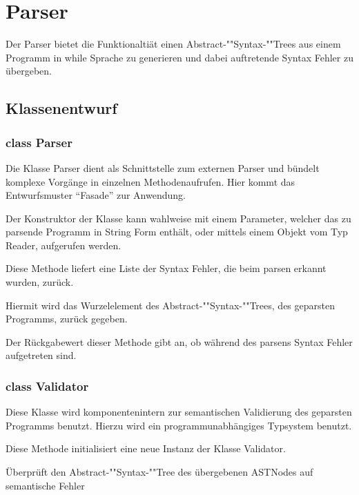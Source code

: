 \section{Parser}

Der Parser bietet die Funktionaltiät einen Abstract-""Syntax-""Trees aus einem Programm in while Sprache zu generieren und dabei auftretende Syntax Fehler zu übergeben.

\subsection{Klassenentwurf}

\subsubsection{class Parser}

Die Klasse Parser dient als Schnittstelle zum externen Parser und bündelt komplexe Vorgänge in einzelnen Methodenaufrufen. Hier kommt das Entwurfsmuster "`Fasade"' zur Anwendung.

\begin{description}
		Der Konstruktor der Klasse kann wahlweise mit einem Parameter, welcher das zu parsende Programm in String Form enthält, oder mittels einem Objekt vom Typ Reader, aufgerufen werden.

		Diese Methode liefert eine Liste der Syntax Fehler, die beim parsen erkannt wurden, zurück.
  
		Hiermit wird das Wurzelelement des Abstract-""Syntax-""Trees, des geparsten Programms, zurück gegeben.

		Der Rückgabewert dieser Methode gibt an, ob während des parsens Syntax Fehler aufgetreten sind.
\end{description}

\subsubsection{class Validator}

Diese Klasse wird komponentenintern zur semantischen Validierung des geparsten Programms benutzt. Hierzu wird ein programmunabhängiges Typsystem benutzt.

\begin{description}
		Diese Methode initialisiert eine neue Instanz der Klasse Validator.

		Überprüft den Abstract-""Syntax-""Tree des übergebenen ASTNodes auf semantische Fehler
\end{description}

